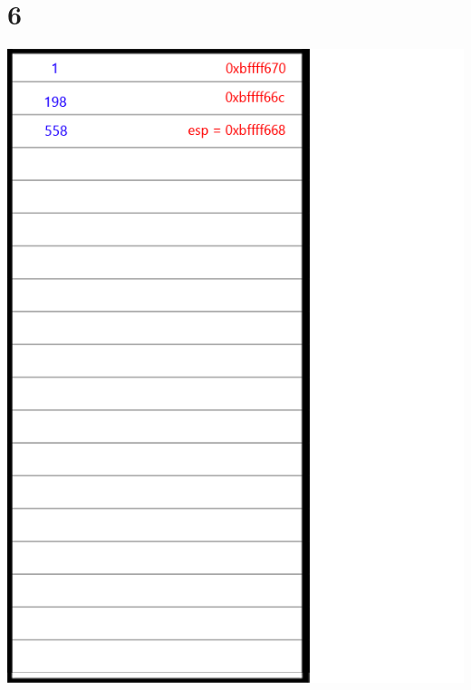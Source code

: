 \documentclass{article}
\begin{document}
\section*{6}
\begin{minipage}{5cm}
\includegraphics[scale=0.3]{s3.png}
\end{minipage}
\end{document}
